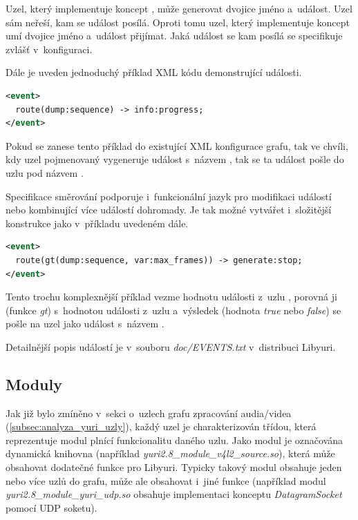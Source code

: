 \documentclass[thesis=M,czech]{FITthesis}[2012/06/26]
\begin{document}
Uzel, který implementuje koncept , může generovat dvojice jméno a~událost. Uzel sám neřeší, kam se událost posílá. Oproti tomu uzel, který implementuje koncept  umí dvojice jméno a~událost přijímat. Jaká událost se kam posílá se specifikuje zvlášť v~konfiguraci.

Dále je uveden jednoduchý příklad XML kódu demonstrující události.\\

\begin{lstlisting}[language=XML]
<event>
  route(dump:sequence) -> info:progress;
</event>
\end{lstlisting}
Pokud se zanese tento příklad do existující XML konfigurace grafu, tak ve chvíli, kdy uzel pojmenovaný  vygeneruje událost s~názvem , tak se ta událost pošle do uzlu  pod názvem .

Specifikace směrování podporuje i~funkcionální jazyk pro modifikaci událostí nebo kombinující více událostí dohromady. Je tak možné vytvářet i~složitější konstrukce jako v~příkladu uvedeném dále.\\

\begin{lstlisting}[language=XML]
<event>
  route(gt(dump:sequence, var:max_frames)) -> generate:stop;
</event>
\end{lstlisting}

Tento trochu komplexnější příklad vezme hodnotu události  z~uzlu , porovná ji (funkce \textit{gt}) s~hodnotou události  z~uzlu  a~výsledek (hodnota \textit{true} nebo \textit{false}) se pošle na uzel  jako událost s~názvem .

Detailnější popis událostí je v~souboru \textit{doc/EVENTS.txt} v~distribuci Libyuri.
	
\subsection{Moduly} \label{subsec:analyza_yuri_moduly}
Jak již bylo zmíněno v~sekci o~uzlech grafu zpracování audia/videa (\ref{subsec:analyza_yuri_uzly}), každý uzel je charakterizován třídou, která reprezentuje modul plnící funkcionalitu daného uzlu. Jako modul je označována dynamická knihovna (například \textit{yuri2.8\_module\_v4l2\_source.so}), která může obsahovat dodatečné funkce pro Libyuri. Typicky takový modul obsahuje jeden nebo více uzlů do grafu, může ale obsahovat i~jiné funkce (například modul \textit{yuri2.8\_module\_yuri\_udp.so} obsahuje implementaci konceptu \textit{DatagramSocket} pomocí UDP soketu). 
\end{document}
